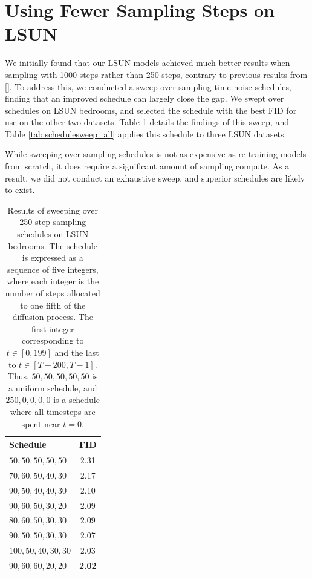 \documentclass{article}
\newcommand{\namecite}[1]{\citeauthor{#1} [\citenum{#1}]}
\begin{document}
\clearpage
\section{Using Fewer Sampling Steps on LSUN}
\label{app:lsunsweep}

We initially found that our LSUN models achieved much better results when sampling with 1000 steps rather than 250 steps, contrary to previous results from \namecite{improved}. To address this, we conducted a sweep over sampling-time noise schedules, finding that an improved schedule can largely close the gap. We swept over schedules on LSUN bedrooms, and selected the schedule with the best FID for use on the other two datasets. Table \ref{tab:schedulesweep} details the findings of this sweep, and Table \ref{tab:schedulesweep_all} applies this schedule to three LSUN datasets.

While sweeping over sampling schedules is not as expensive as re-training models from scratch, it does require a significant amount of sampling compute. As a result, we did not conduct an exhaustive sweep, and superior schedules are likely to exist.

\begin{table}[h]
    \begin{center}
    \begin{small}
    \begin{tabular}{lc}
    \toprule
    Schedule & FID \\
    \midrule
    $50,50,50,50,50$ & 2.31 \\
    $70,60,50,40,30$ & 2.17 \\
    $90,50,40,40,30$ & 2.10 \\
    $90,60,50,30,20$ & 2.09 \\
    $80,60,50,30,30$ & 2.09 \\
    $90,50,50,30,30$ & 2.07 \\
    $100,50,40,30,30$ & 2.03 \\
    $90,60,60,20,20$ & \bf 2.02 \\
    \bottomrule
    \end{tabular}
    \end{small}
    \end{center}
    \caption{Results of sweeping over 250 step sampling schedules on LSUN bedrooms. The schedule is expressed as a sequence of five integers, where each integer is the number of steps allocated to one fifth of the diffusion process. The first integer corresponding to $t \in [0,199]$ and the last to $t \in [T-200,T-1]$. Thus, $50,50,50,50,50$ is a uniform schedule, and $250,0,0,0,0$ is a schedule where all timesteps are spent near $t=0$.}
    \label{tab:schedulesweep}
\end{table}
\end{document}
